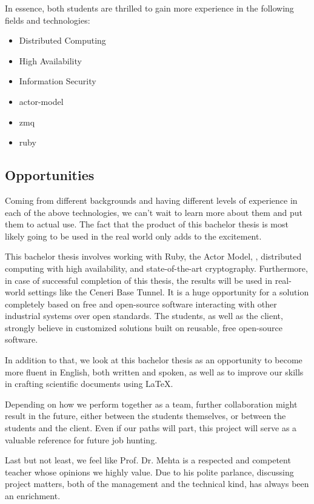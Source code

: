 In essence, both students are thrilled to gain more experience in the following
fields and technologies:

\begin{itemize}
	\item Distributed Computing
	\item High Availability
	\item Information Security
	\item \gls{actor-model}
	\item \gls{zmq}
	\item \gls{ruby}
\end{itemize}

\subsection{Opportunities}
Coming from different backgrounds and having different levels of experience in
each of the above technologies, we can't wait to learn more about them and put
them to actual use. The fact that the product of this bachelor thesis is most
likely going to be used in the real world only adds to the excitement.

This bachelor thesis involves working with Ruby, the Actor Model, \zmq,
distributed computing with high availability, and state-of-the-art
cryptography. Furthermore, in case of successful completion of this thesis, the results will be used in real-world settings like the Ceneri
Base Tunnel. It is a huge opportunity for a solution completely based on free
and open-source software interacting with other industrial systems over open standards. The students, as well as the client, strongly believe
in customized solutions built on reusable, free open-source software.

In addition to that, we look at this bachelor thesis as an opportunity to
become more fluent in English, both written and spoken, as well as to improve
our skills in crafting scientific documents using {\LaTeX}.

Depending on how we perform together as a team, further collaboration might
result in the future, either between the students themselves, or between the
students and the client. Even if our paths will part, this project will
serve as a valuable reference for future job hunting.

Last but not least, we feel like Prof. Dr. Mehta is a respected and competent
teacher whose opinions we highly value. Due to his polite parlance, discussing
project matters, both of the management and the technical kind, has always been
an enrichment.

